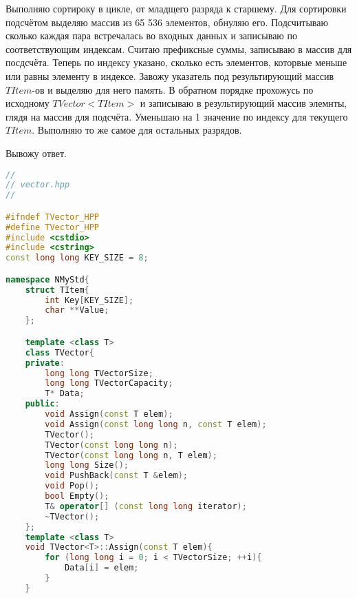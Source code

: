 Выполняю сортироку в цикле, от младщего разряда к старшему. Для сортировки подсчётом выделяю массив из 65 536 элементов, обнуляю его. Подсчитываю сколько каждая пара встречалась во входных данных и записываю по соответствующим индексам. Считаю префиксные суммы, записываю в массив для посдсчёта. Теперь по индексу указано, сколько есть элементов, которвые меньше или равны элементу в индексе. Завожу указатель под результирующий массив $TItem$-ов и выделяю для него память. В обратном порядке прохожусь по исходному $TVector<TItem>$ и записываю в результирующий массив элемнты, глядя на массив для подсчёта. Уменьшаю на 1 значение по индексу для текущего $TItem$. Выполняю то же самое для остальных разрядов.

Вывожу ответ.

\pagebreak
\begin{lstlisting}[language=C++]
//
// vector.hpp
//

#ifndef TVector_HPP
#define TVector_HPP
#include <cstdio>
#include <cstring>
const long long KEY_SIZE = 8;

namespace NMyStd{
    struct TItem{
        int Key[KEY_SIZE];
        char **Value;
    };

    template <class T>
    class TVector{
    private:
        long long TVectorSize;
        long long TVectorCapacity;
        T* Data;
    public:
        void Assign(const T elem);
        void Assign(const long long n, const T elem);
        TVector();
        TVector(const long long n);
        TVector(const long long n, T elem);
        long long Size();
        void PushBack(const T &elem);
        void Pop();
        bool Empty();
        T& operator[] (const long long iterator);
        ~TVector();
    };
    template <class T>
    void TVector<T>::Assign(const T elem){
        for (long long i = 0; i < TVectorSize; ++i){
            Data[i] = elem;
        }
    }


\end{lstlisting}
